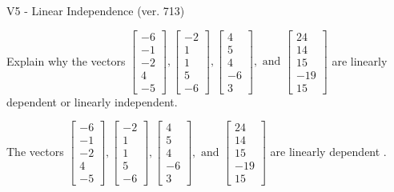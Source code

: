 \begin{exercise}
  \begin{exerciseTitle}V5 - Linear Independence (ver. 713)\end{exerciseTitle}
  \begin{exerciseStatement}
    Explain why the vectors \(\left[\begin{array}{r}
-6 \\
-1 \\
-2 \\
4 \\
-5
\end{array}\right] , \left[\begin{array}{r}
-2 \\
1 \\
1 \\
5 \\
-6
\end{array}\right] , \left[\begin{array}{r}
4 \\
5 \\
4 \\
-6 \\
3
\end{array}\right] , \text{ and } \left[\begin{array}{r}
24 \\
14 \\
15 \\
-19 \\
15
\end{array}\right]\) are linearly dependent or linearly independent.	


  \end{exerciseStatement}
  \begin{exerciseAnswer}
   The vectors \(\left[\begin{array}{r}
-6 \\
-1 \\
-2 \\
4 \\
-5
\end{array}\right] , \left[\begin{array}{r}
-2 \\
1 \\
1 \\
5 \\
-6
\end{array}\right] , \left[\begin{array}{r}
4 \\
5 \\
4 \\
-6 \\
3
\end{array}\right] , \text{ and } \left[\begin{array}{r}
24 \\
14 \\
15 \\
-19 \\
15
\end{array}\right]\) are 
  	 linearly dependent  .
  


  \end{exerciseAnswer}
\end{exercise}